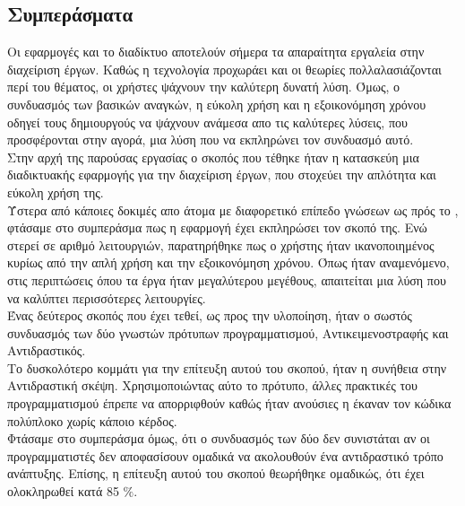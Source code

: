 \subsection*{Συμπεράσματα}
\pSpace Οι εφαρμογές και το διαδίκτυο αποτελούν σήμερα τα απαραίτητα εργαλεία στην διαχείριση έργων. Καθώς η τεχνολογία προχωράει και οι θεωρίες πολλαλασιάζονται περί του θέματος, οι χρήστες ψάχνουν την καλύτερη δυνατή λύση. Όμως, ο συνδυασμός των βασικών αναγκών, η εύκολη χρήση και η εξοικονόμηση χρόνου οδηγεί τους δημιουργούς να ψάχνουν ανάμεσα απο τις καλύτερες λύσεις, που προσφέρονται στην αγορά, μια λύση που να εκπληρώνει τον συνδυασμό αυτό.\\
\pSpace Στην αρχή της παρούσας εργασίας ο σκοπός που τέθηκε ήταν η κατασκεύη μια διαδικτυακής εφαρμογής για την διαχείριση έργων, που στοχεύει την απλότητα και εύκολη χρήση της.\\
\pSpace Ύστερα από κάποιες δοκιμές απο άτομα με διαφορετικό επίπεδο γνώσεων ως πρός το , φτάσαμε στο συμπεράσμα πως η εφαρμογή έχει εκπληρώσει τον σκοπό της. Ενώ στερεί σε αριθμό λειτουργιών, παρατηρήθηκε πως ο χρήστης ήταν ικανοποιημένος κυρίως από την απλή χρήση και την εξοικονόμηση χρόνου. Όπως ήταν αναμενόμενο, στις περιπτώσεις όπου τα έργα ήταν μεγαλύτερου μεγέθους, απαιτείται μια λύση που να καλύπτει περισσότερες λειτουργίες.\\
\pSpace Ένας δεύτερος σκοπός που έχει τεθεί, ως προς την υλοποίηση, ήταν ο σωστός συνδυασμός των δύο γνωστών πρότυπων προγραμματισμού, Αντικειμενοστραφής και Αντιδραστικός.\\
\pSpace Το δυσκολότερο κομμάτι για την επίτευξη αυτού του σκοπού, ήταν η συνήθεια στην Αντιδραστική σκέψη. Χρησιμοποιώντας αύτο το πρότυπο, άλλες πρακτικές του προγραμματισμού έπρεπε να απορριφθούν καθώς ήταν ανούσιες η έκαναν τον κώδικα πολύπλοκο χωρίς κάποιο κέρδος.\\
\pSpace Φτάσαμε στο συμπεράσμα όμως, ότι ο συνδυασμός των δύο δεν συνιστάται αν οι προγραμματιστές δεν αποφασίσουν ομαδικά να ακολουθούν ένα αντιδραστικό τρόπο ανάπτυξης. Επίσης, η επίτευξη αυτού του σκοπού θεωρήθηκε ομαδικώς, ότι έχει ολοκληρωθεί κατά 85 $\%$.\\

